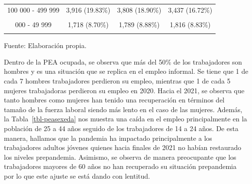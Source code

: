 \documentclass[
  letterpaper,
  12pt,
  oneside,
  spanish,
  doublespacing,
  headsepline,
  parskip]{MastersDoctoralThesis}
\begin{document}
\begin{table}[H]
\begin{tabular}{cccc}
100 000 - 499 999 & 3,916 (19.83\%) & 3,808 (18.90\%) & 3,437 (16.72\%)\\
\cellcolor{gray!6}{50 000 - 99 999} & \cellcolor{gray!6}{1,131 (5.73\%)} & \cellcolor{gray!6}{1,071 (5.32\%)} & \cellcolor{gray!6}{1,152 (5.60\%)}\\
\addlinespace
20 000 - 49 999 & 1,718 (8.70\%) & 1,789 (8.88\%) & 1,816 (8.83\%)\\
\cellcolor{gray!6}{2 000 - 19 999} & \cellcolor{gray!6}{3,264 (16.53\%)} & \cellcolor{gray!6}{3,559 (17.66\%)} & \cellcolor{gray!6}{3,895 (18.94\%)}\\
\bottomrule
\end{tabular}
\endgroup{}
\end{table}

\noindent \small Fuente: Elaboración propia. \normalsize

Dentro de la PEA ocupada, se observa que más del 50\% de los
trabajadores son hombres y es una situación que se replica en el empleo
informal. Se tiene que 1 de cada 7 hombres trabajadores perdieron su
empleo, mientras que 1 de cada 5 mujeres trabajadoras perdieron su
empleo en 2020. Hacia el 2021, se observa que tanto hombres como mujeres
han tenido una recuperación en términos del tamaño de la fuerza laboral
siendo más lento en el caso de las mujeres. Además, la
Tabla~\ref{tbl-peasexeda} nos muestra una caída en el empleo
principalmente en la población de 25 a 44 años seguido de los
trabajadores de 14 a 24 años. De esta manera, hallamos que la pandemia
ha impactado principalmente a los trabajadores adultos jóvenes quienes
hacia finales de 2021 no habían restaurado los niveles prepandemia.
Asimismo, se observa de manera preocupante que los trabajadores mayores
de 60 años no han recuperado su situación prepandemia por lo que este
ajuste se está dando con lentitud.
\end{document}
